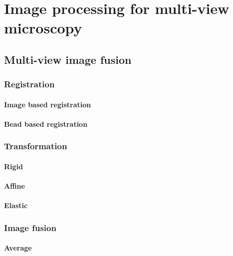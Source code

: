 

\chapter{Image processing for multi-view microscopy}
  \graphicspath{{./figures/3_processing/}}


\section{Multi-view image fusion}
  \subsection{Registration}
    \subsubsection{Image based registration}
    \subsubsection{Bead based registration}
  \subsection{Transformation}
    \subsubsection{Rigid}
    \subsubsection{Affine}
    \subsubsection{Elastic}
  \subsection{Image fusion}
      \subsubsection{Average}
